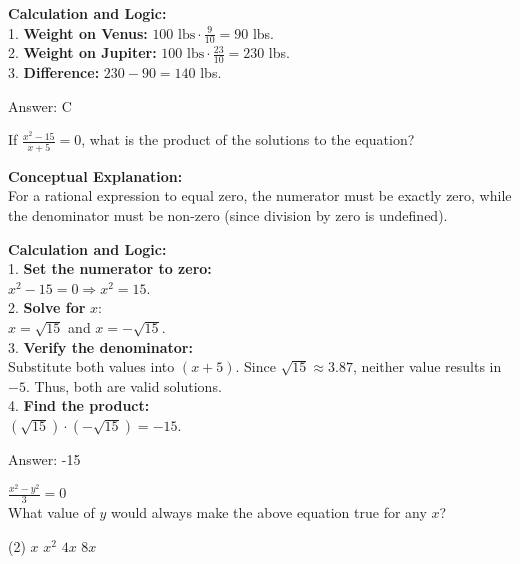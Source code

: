 \documentclass[11pt,paper=a4,answers]{exam}
\begin{document}
\begin{questions}
\begin{solution}
\textbf{Calculation and Logic:} \\
1. \textbf{Weight on Venus:} $100 \text{ lbs} \cdot \frac{9}{10} = 90$ lbs. \\
2. \textbf{Weight on Jupiter:} $100 \text{ lbs} \cdot \frac{23}{10} = 230$ lbs. \\
3. \textbf{Difference:} $230 - 90 = 140$ lbs.

\vspace{30pt}

Answer: \colorbox{yellow!100}{C}
\end{solution}

\question
If $\frac{x^2 - 15}{x+5} = 0$, what is the product of the solutions to the equation?

\begin{solution}
\textbf{Conceptual Explanation:} \\
For a rational expression to equal zero, the numerator must be exactly zero, while the denominator must be non-zero (since division by zero is undefined).

\vspace{30pt}

\textbf{Calculation and Logic:} \\
1. \textbf{Set the numerator to zero:} \\
$x^2 - 15 = 0 \Rightarrow x^2 = 15$. \\
2. \textbf{Solve for } $x$: \\
$x = \sqrt{15}$ and $x = -\sqrt{15}$. \\
3. \textbf{Verify the denominator:} \\
Substitute both values into $(x+5)$. Since $\sqrt{15} \approx 3.87$, neither value results in $-5$. Thus, both are valid solutions. \\
4. \textbf{Find the product:} \\
$(\sqrt{15}) \cdot (-\sqrt{15}) = -15$.

\vspace{30pt}

Answer: \colorbox{yellow!100}{-15}
\end{solution}

\vspace{60pt}

\question
$\frac{x^2 - y^2}{3} = 0$ \\
What value of $y$ would always make the above equation true for any $x$?
\begin{tasks}(2)
    \task $x$
    \task $x^2$
    \task $4x$
    \task $8x$
\end{tasks}


\end{questions}
\end{document}
